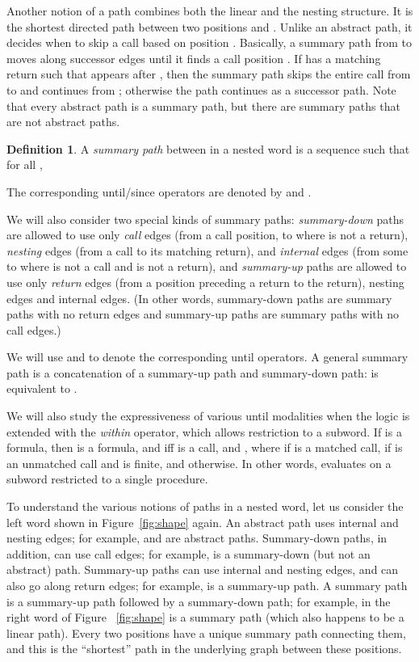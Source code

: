 \documentclass{LMCS}
\theoremstyle{plain}
\theoremstyle{definition}
\newtheorem{definition}{Definition}[section]
\newcounter{example}
\begin{document}
Another notion of a path combines both the linear and the nesting
structure. It is the shortest directed path between two positions 
 and . Unlike
an abstract path, it decides when to skip a 
call based on position . Basically, a summary path from  to  moves along successor
edges until it finds a call position . 
If  has a matching return  such that  appears after ,
then the summary path skips the entire call from  to  and
continues from ; otherwise 
the path continues as a successor path.
Note that every abstract path is a summary path, but there are summary paths that are
not abstract paths.

\begin{definition}
A {\em summary path} between  in a nested word  is a sequence
 such that for all , 

The corresponding until/since operators are denoted by  and
. 
\end{definition}

We will also consider two special kinds of summary paths: {\em
summary-down\/} paths are allowed to use only {\em call} edges (from a
call position,  to  where  is not a return), {\em nesting} edges (from
a call to its matching return), and {\em internal} edges (from some
 to  where  is not a call and  is not a return), and {\em
summary-up\/} paths are allowed to use only {\em return} edges (from a
position preceding a return to the return), nesting edges and internal
edges.  (In other words, summary-down paths are summary paths with no
return edges and summary-up paths are summary paths with no call edges.)

We will use  and  to denote the
corresponding until operators.  A general summary path is a concatenation of a summary-up path and
summary-down path:  is equivalent to
. 


We will also study the expressiveness of various until modalities when
the logic is extended with the {\em within\/} operator, which allows
restriction to a subword.  If  is a formula, then  is a
formula, and  iff  is a call, and
, where  if  is a matched call,
 if  is an unmatched call and  is finite, and  otherwise.  In other words,  evaluates  on a
subword restricted to a single procedure.



To understand the various notions of paths in a nested word, let us
consider the left word shown in Figure~\ref{fig:shape} again.  An
abstract path uses internal and nesting edges; for
example,  and  are
abstract paths.  Summary-down paths, in addition, can use call edges;
for example,  is a summary-down
(but not an abstract) path.  Summary-up paths 
can use internal and nesting edges, and can also go 
along return edges; for example,  is a
summary-up path.  A summary path is a summary-up path followed by a
summary-down path; for example,  
in the right word of Figure ~\ref{fig:shape} is a
summary path (which also happens to be a linear path).  
Every two positions have a unique
summary path connecting them, and this is the ``shortest'' path in the
underlying graph between these positions.
\end{document}
